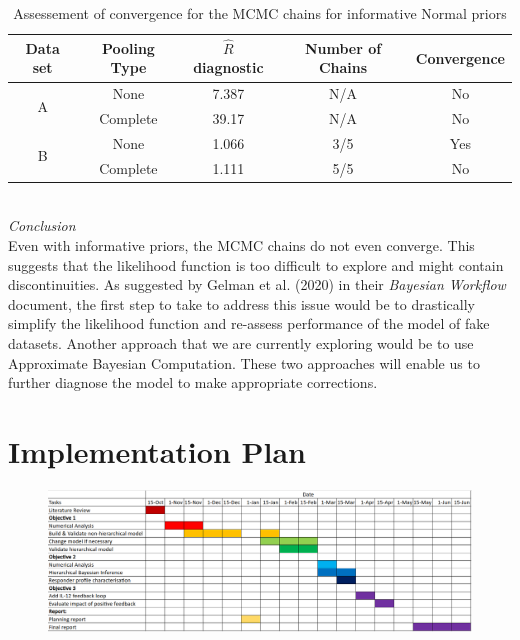 \documentclass[11pt]{article}
\begin{document}
\begin{table}[!h]
    \centering
    \caption{Assessement of convergence for the MCMC chains for informative Normal priors}
    \begin{tabular}{c|c||c|c|c}
        \hline
        Data set & Pooling Type & $\hat{R}$ diagnostic & Number of Chains & Convergence  \\ \hline 
        \multirow{2}{*}{A}      & None     & 7.387 & N/A & No \\
                                & Complete & 39.17 & N/A & No \\ \hline 
        \multirow{2}{*}{B}      & None     & 1.066 & 3/5 & Yes \\
                                & Complete & 1.111 & 5/5 & No \\ \hline 
    \end{tabular}
    \label{tbl:rhat_4}
\end{table}
~\\
\textit{Conclusion}\\[5pt]
Even with informative priors, the MCMC chains do not even converge. This suggests that the likelihood function is too difficult to explore and might contain discontinuities. As suggested by Gelman et al. (2020) in their \textit{Bayesian Workflow} document, the first step to take to address this issue would be to drastically simplify the likelihood function and re-assess performance of the model of fake datasets. Another approach that we are currently exploring would be to use Approximate Bayesian Computation. These two approaches will enable us to further diagnose the model to make appropriate corrections.


\section{Implementation Plan}\label{sec:plan}

\begin{figure}[!ht]
    \centering\includegraphics[scale=0.32]{testo.png}
\end{figure}
\end{document}
